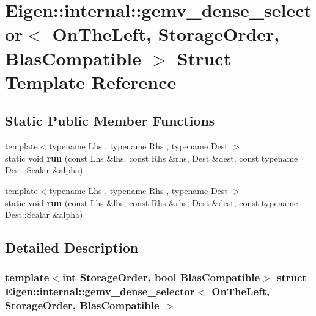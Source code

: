 \hypertarget{struct_eigen_1_1internal_1_1gemv__dense__selector_3_01_on_the_left_00_01_storage_order_00_01_blas_compatible_01_4}{}\section{Eigen\+:\+:internal\+:\+:gemv\+\_\+dense\+\_\+selector$<$ On\+The\+Left, Storage\+Order, Blas\+Compatible $>$ Struct Template Reference}
\label{struct_eigen_1_1internal_1_1gemv__dense__selector_3_01_on_the_left_00_01_storage_order_00_01_blas_compatible_01_4}
\subsection*{Static Public Member Functions}
\begin{DoxyCompactItemize}
\item 
\mbox{\label{struct_eigen_1_1internal_1_1gemv__dense__selector_3_01_on_the_left_00_01_storage_order_00_01_blas_compatible_01_4_a7854af86ce3fc5c7e904b1ac377fc2b4}} 
{\footnotesize template$<$typename Lhs , typename Rhs , typename Dest $>$ }\\static void {\bfseries run} (const Lhs \&lhs, const Rhs \&rhs, Dest \&dest, const typename Dest\+::\+Scalar \&alpha)
\item 
\mbox{\label{struct_eigen_1_1internal_1_1gemv__dense__selector_3_01_on_the_left_00_01_storage_order_00_01_blas_compatible_01_4_a7854af86ce3fc5c7e904b1ac377fc2b4}} 
{\footnotesize template$<$typename Lhs , typename Rhs , typename Dest $>$ }\\static void {\bfseries run} (const Lhs \&lhs, const Rhs \&rhs, Dest \&dest, const typename Dest\+::\+Scalar \&alpha)
\end{DoxyCompactItemize}


\subsection{Detailed Description}
\subsubsection*{template$<$int Storage\+Order, bool Blas\+Compatible$>$\newline
struct Eigen\+::internal\+::gemv\+\_\+dense\+\_\+selector$<$ On\+The\+Left, Storage\+Order, Blas\+Compatible $>$}



